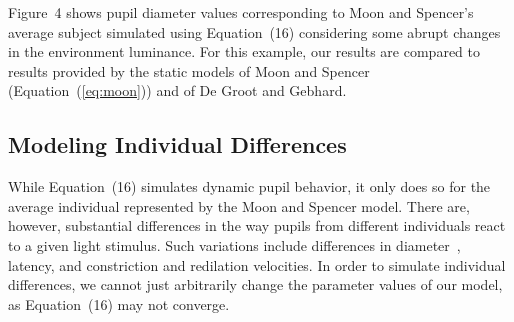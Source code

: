\documentclass{acmtog}
\begin{document}
Figure~4 shows pupil diameter values corresponding to Moon and Spencer's average
subject simulated using Equation~(16) considering some abrupt changes in the environment luminance.
For this example, our results are compared to results provided by the static models of Moon and Spencer
(Equation~(\ref{eq:moon})) and of De Groot and Gebhard.
%

\subsection{Modeling Individual Differences}
\label{subsec:Variations}

While Equation~(16) simulates dynamic pupil behavior, it only does so for the average individual
represented by the Moon and Spencer model. There are, however, substantial differences in the way pupils from different
individuals react to a given light stimulus.  Such variations include differences in
diameter~\cite{google}, latency, and constriction and redilation
velocities. In order to simulate individual differences, we cannot just arbitrarily change
the parameter values of our model, as Equation~(16) may not converge. 
\end{document}
